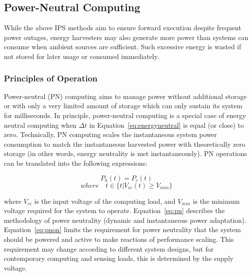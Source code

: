 \subsection{Power-Neutral Computing}

While the above IPS methods aim to ensure forward execution despite frequent power outages, energy harvesters may also generate more power than systems can consume when ambient sources are sufficient. 
Such excessive energy is wasted if not stored for later usage or consumed immediately. 

\subsubsection{Principles of Operation}

Power-neutral (PN) computing aims to manage power without additional storage or with only a very limited amount of storage which can only sustain its system for milliseconds. In principle, power-neutral computing is a special case of energy neutral computing when $\Delta t$ in Equation~\ref{eq:energyneutral} is equal (or close) to zero. Technically, PN computing scales the instantaneous system power consumption to match the instantaneous harvested power with theoretically zero storage (in other words, energy neutrality is met instantaneously). PN operations can be translated into the following expressions:

\begin{equation} \label{eq:pn}
    P_h(t) = P_c(t)
\end{equation}
\begin{equation} \label{eq:pnon}
    where\quad t \in \{t|V_{cc}(t) \geq V_{min}\}
\end{equation}

where $V_{cc}$ is the input voltage of the computing load, and $V_{min}$ is the minimum voltage required for the system to operate. Equation~\ref{eq:pn} describes the methodology of power neutrality (dynamic and instantaneous power adaptation). Equation~\ref{eq:pnon} limits the requirement for power neutrality that the system should be powered and active to make reactions of performance scaling. This requirement may change according to different system designs, but for contemporary computing and sensing loads, this is determined by the supply voltage. 

